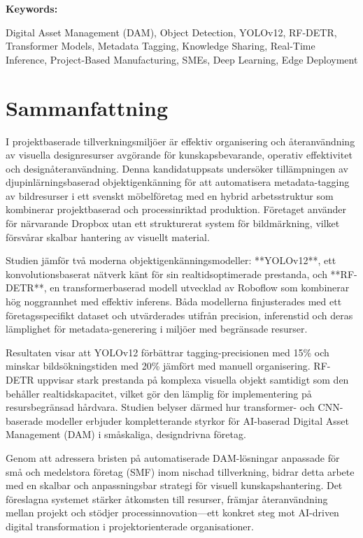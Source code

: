 \documentclass[a4paper,10pt,twocolumn]{article}
\numberwithin{figure}{section}
\numberwithin{table}{section}
\begin{document}
\vspace{0.3cm} 
\textbf{Keywords:} 
    
Digital Asset Management (DAM), Object Detection, YOLOv12, RF-DETR, 
Transformer Models, Metadata Tagging, Knowledge Sharing, Real-Time Inference, 
Project-Based Manufacturing, SMEs, Deep Learning, Edge Deployment

\section*{Sammanfattning}

I projektbaserade tillverkningsmiljöer är effektiv organisering och återanvändning av visuella designresurser avgörande för kunskapsbevarande, operativ effektivitet och designåteranvändning. Denna kandidatuppsats undersöker tillämpningen av djupinlärningsbaserad objektigenkänning för att automatisera metadata-tagging av bildresurser i ett svenskt möbelföretag med en hybrid arbetsstruktur som kombinerar projektbaserad och processinriktad produktion. Företaget använder för närvarande Dropbox utan ett strukturerat system för bildmärkning, vilket försvårar skalbar hantering av visuellt material.

Studien jämför två moderna objektigenkänningsmodeller: **YOLOv12**, ett konvolutionsbaserat nätverk känt för sin realtidsoptimerade prestanda, och **RF-DETR**, en transformerbaserad modell utvecklad av Roboflow som kombinerar hög noggrannhet med effektiv inferens. Båda modellerna finjusterades med ett företagsspecifikt dataset och utvärderades utifrån precision, inferenstid och deras lämplighet för metadata-generering i miljöer med begränsade resurser.

Resultaten visar att YOLOv12 förbättrar tagging-precisionen med 15\% och minskar bildsökningstiden med 20\% jämfört med manuell organisering. RF-DETR uppvisar stark prestanda på komplexa visuella objekt samtidigt som den behåller realtidskapacitet, vilket gör den lämplig för implementering på resursbegränsad hårdvara. Studien belyser därmed hur transformer- och CNN-baserade modeller erbjuder kompletterande styrkor för AI-baserad Digital Asset Management (DAM) i småskaliga, designdrivna företag.

Genom att adressera bristen på automatiserade DAM-lösningar anpassade för små och medelstora företag (SMF) inom nischad tillverkning, bidrar detta arbete med en skalbar och anpassningsbar strategi för visuell kunskapshantering. Det föreslagna systemet stärker åtkomsten till resurser, främjar återanvändning mellan projekt och stödjer processinnovation—ett konkret steg mot AI-driven digital transformation i projektorienterade organisationer.
\end{document}
